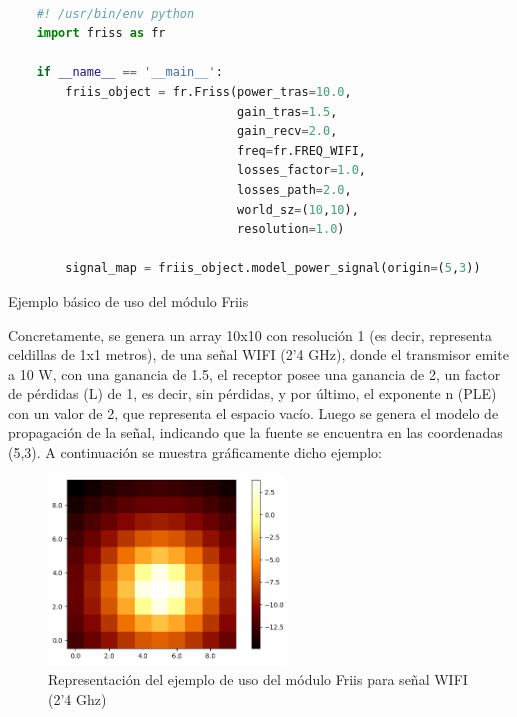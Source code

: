 \begin{code}[H]
    \begin{lstlisting}[language=Python]

    #! /usr/bin/env python
    import friss as fr

    if __name__ == '__main__':
        friis_object = fr.Friss(power_tras=10.0,
                                gain_tras=1.5,
                                gain_recv=2.0,
                                freq=fr.FREQ_WIFI,
                                losses_factor=1.0,
                                losses_path=2.0,
                                world_sz=(10,10),
                                resolution=1.0)

        signal_map = friis_object.model_power_signal(origin=(5,3))

\end{lstlisting}
\caption[Ejemplo básico de uso del módulo Friis]{Ejemplo básico de uso del módulo Friis}
\label{cod:friis_basics}
\end{code}

Concretamente, se genera un array 10x10 con resolución 1 (es decir, representa celdillas de 1x1 metros), de una señal WIFI (2'4 GHz), donde el transmisor emite a 10 W, con una ganancia de 1.5, el receptor posee una ganancia de 2, un factor de pérdidas (L) de 1, es decir, sin pérdidas, y por último, el exponente n (\ac{PLE}) con un valor de 2, que representa el espacio vacío. Luego se genera el modelo de propagación de la señal, indicando que la fuente se encuentra en las coordenadas (5,3). A continuación se muestra gráficamente dicho ejemplo:\\

\begin{figure} [t]
	\begin{center}
	\includegraphics[height=5cm]{imagenes/cap4/4_heatmap_example.png}
	\end{center}
	\caption[Representación del ejemplo de uso del módulo Friis para señal WIFI (2'4 Ghz)]{Representación del ejemplo de uso del módulo Friis para señal WIFI (2'4 Ghz)}
	\label{fig:heat_ex}
\end{figure}

